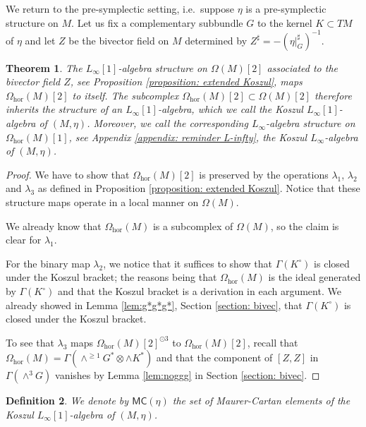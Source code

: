 \documentclass[11pt,thmsa]{amsart}
\newtheorem{theorem}{Theorem}[section]
\newtheorem{definition}[theorem]{Definition}
\theoremstyle{definition}
\newcommand{\hor}{\mathrm{hor}}
\newcommand{\MC}{\mathsf{MC}}
\newcommand{\lione}{$L_{\infty}[1]$-algebra }
\begin{document}
{We return to the pre-symplectic setting, i.e.~suppose $\eta$ is a pre-symplectic structure on $M$.
Let us fix a complementary subbundle $G$ to the kernel $K\subset TM$
of $\eta$
and let $Z$ be the bivector field on $M$ determined by
$ Z^\sharp = -(\eta\vert_G^\sharp)^{-1}$.

\begin{theorem}\label{theorem: construction - Koszul L-infty}
The $L_{\infty}[1]$-algebra structure  
 on $\Omega(M)[2]$ associated to the bivector field $Z$, see Proposition \ref{proposition: extended Koszul},
maps $\Omega_\hor(M)[2]$ to itself.
The subcomplex $\Omega_\hor(M)[2] \subset \Omega(M)[2]$ therefore inherits the structure of an
$L_\infty[1]$-algebra, which we call the {\em Koszul $L_\infty[1]$-algebra} of $(M,\eta)$. Moreover, we call the corresponding $L_\infty$-algebra structure on $\Omega_\hor(M)[1]$, see Appendix \ref{appendix: reminder L-infty}, the {\em Koszul $L_\infty$-algebra} of $(M,\eta)$.
\end{theorem}

\begin{proof}


We have to show that $\Omega_\hor(M)[2]$ is preserved by the operations $\lambda_1$, $\lambda_2$ and $\lambda_3$
as defined in Proposition \ref{proposition: extended Koszul}.
Notice that these structure maps  operate in a local manner on $\Omega(M)$. 

We already know that $\Omega_\hor(M)$ is a subcomplex of $\Omega(M)$, so the claim is clear for $\lambda_1$.

For the binary map $\lambda_2$, we notice that it suffices to show that
$\Gamma(K^\circ)$ is closed under the Koszul bracket; the reasons being that $\Omega_\hor(M)$
is the ideal generated by $\Gamma(K^\circ)$ and that the Koszul bracket is a derivation in each argument. We already showed in Lemma \ref{lem:g*g*g*}, Section \ref{section: bivec}, that $\Gamma(K^\circ)$ is closed under the Koszul bracket.



 
To see that $\lambda_3$ maps $\Omega_\hor(M)[2]^{\odot 3}$ to $\Omega_\hor(M)[2]$, recall that
$\Omega_\hor(M)=\Gamma(\wedge^{\ge 1}G^*\otimes \wedge K^*)$ and that the component of $[Z,Z]$ in $\Gamma(\wedge^3 G)$ vanishes by Lemma \ref{lem:noggg} in Section \ref{section: bivec}.
\end{proof}



\begin{definition}\label{definition: MC for pre-symplectic}
We denote by $\MC(\eta)$ the set of Maurer-Cartan elements of
the Koszul \lione of $(M,\eta)$.
\end{definition}

}
\end{document}
